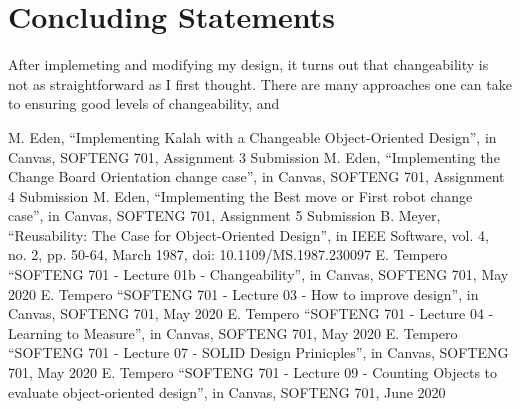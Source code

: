 \documentclass[10pt, a4paper, conference]{IEEEtran}
\begin{document}
\section{Concluding Statements}
After implemeting and modifying my design, it turns out that changeability is 
not as straightforward as I first thought. There are many approaches one can
take to ensuring good levels of changeability, and

\begin{thebibliography}{00}
   M. Eden, ``Implementing Kalah with a Changeable
    Object-Oriented Design'', in Canvas, SOFTENG 701, Assignment 3 
    Submission
   M. Eden, ``Implementing the Change Board Orientation
    change case'', in Canvas, SOFTENG 701, Assignment 4 Submission
   M. Eden, ``Implementing the Best move or First robot
    change case'', in Canvas, SOFTENG 701, Assignment 5 Submission
   B. Meyer, ``Reusability: The Case for Object-Oriented
    Design'', in IEEE Software, vol. 4, no. 2, pp. 50-64, March 1987, 
    doi: 10.1109/MS.1987.230097
   E. Tempero ``SOFTENG 701 - Lecture 01b - Changeability'',  in Canvas, SOFTENG 701, May 2020
   E. Tempero ``SOFTENG 701 - Lecture 03 - How to improve design'',  in Canvas, SOFTENG 701, May 2020
   E. Tempero ``SOFTENG 701 - Lecture 04 - Learning to Measure'',  in Canvas, SOFTENG 701, May 2020
   E. Tempero ``SOFTENG 701 - Lecture 07 - SOLID Design Prinicples'',  in Canvas, SOFTENG 701, May 2020
   E. Tempero ``SOFTENG 701 - Lecture 09 - Counting Objects to evaluate object-oriented design'',  in Canvas, SOFTENG 701, June 2020
\end{thebibliography}
\end{document}
